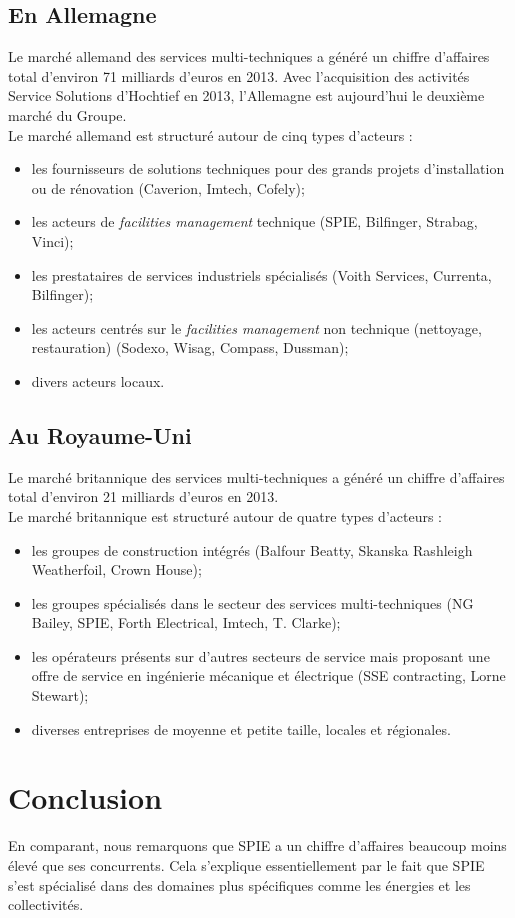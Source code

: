 \subsection{En Allemagne}

Le marché allemand des services multi-techniques a généré un chiffre d’affaires total d’environ 71 milliards d’euros en 2013. Avec l’acquisition des activités Service Solutions d’Hochtief en 2013, l’Allemagne est aujourd’hui le deuxième marché du Groupe.  \\

\noindent Le marché allemand est structuré autour de cinq types d’acteurs : 
\begin{itemize}
    \item les fournisseurs de solutions techniques pour des grands projets d’installation ou de rénovation (Caverion, Imtech, Cofely);
    \item les acteurs de \textit{facilities management} technique (SPIE, Bilfinger, Strabag, Vinci);
    \item les prestataires de services industriels spécialisés (Voith Services, Currenta, Bilfinger);
    \item les acteurs centrés sur le \textit{facilities management} non technique (nettoyage, restauration) (Sodexo, Wisag, Compass, Dussman);
    \item divers acteurs locaux.
\end{itemize}

\subsection{Au Royaume-Uni}

Le marché britannique des services multi-techniques a généré un chiffre d’affaires total d’environ 21 milliards d’euros en 2013. \\

\noindent Le marché britannique est structuré autour de quatre types d’acteurs : 
\begin{itemize}
    \item les groupes de construction intégrés (Balfour Beatty, Skanska Rashleigh Weatherfoil, Crown House);
    \item les groupes spécialisés dans le secteur des services multi-techniques (NG Bailey, SPIE, Forth Electrical, Imtech, T. Clarke);
    \item les opérateurs présents sur d’autres secteurs de service mais proposant une offre de service en ingénierie mécanique et électrique (SSE contracting, Lorne Stewart);
    \item diverses entreprises de moyenne et petite taille, locales et régionales.
\end{itemize}

\section{Conclusion}

En comparant, nous remarquons que SPIE a un chiffre d’affaires beaucoup moins élevé que ses concurrents. Cela s’explique essentiellement par le fait que SPIE s’est spécialisé dans des domaines plus spécifiques comme les énergies et les collectivités.